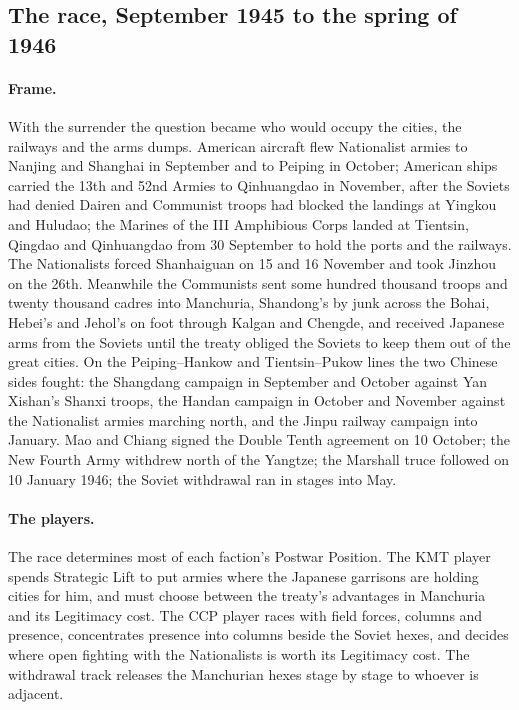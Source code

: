 \documentclass[11pt]{article}
\begin{document}
\clearpage
{}
\subsection{The race, September 1945 to the spring of 1946}
\paragraph{Frame.} With the surrender the question became who would occupy the cities, the railways and the arms dumps. American aircraft flew Nationalist armies to Nanjing and Shanghai in September and to Peiping in October; American ships carried the 13th and 52nd Armies to Qinhuangdao in November, after the Soviets had denied Dairen and Communist troops had blocked the landings at Yingkou and Huludao; the Marines of the III Amphibious Corps landed at Tientsin, Qingdao and Qinhuangdao from 30 September to hold the ports and the railways. The Nationalists forced Shanhaiguan on 15 and 16 November and took Jinzhou on the 26th. Meanwhile the Communists sent some hundred thousand troops and twenty thousand cadres into Manchuria, Shandong's by junk across the Bohai, Hebei's and Jehol's on foot through Kalgan and Chengde, and received Japanese arms from the Soviets until the treaty obliged the Soviets to keep them out of the great cities. On the Peiping--Hankow and Tientsin--Pukow lines the two Chinese sides fought: the Shangdang campaign in September and October against Yan Xishan's Shanxi troops, the Handan campaign in October and November against the Nationalist armies marching north, and the Jinpu railway campaign into January. Mao and Chiang signed the Double Tenth agreement on 10 October; the New Fourth Army withdrew north of the Yangtze; the Marshall truce followed on 10 January 1946; the Soviet withdrawal ran in stages into May.
\paragraph{The players.} The race determines most of each faction's Postwar Position. The KMT player spends Strategic Lift to put armies where the Japanese garrisons are holding cities for him, and must choose between the treaty's advantages in Manchuria and its Legitimacy cost. The CCP player races with field forces, columns and presence, concentrates presence into columns beside the Soviet hexes, and decides where open fighting with the Nationalists is worth its Legitimacy cost. The withdrawal track releases the Manchurian hexes stage by stage to whoever is adjacent.
\end{document}
